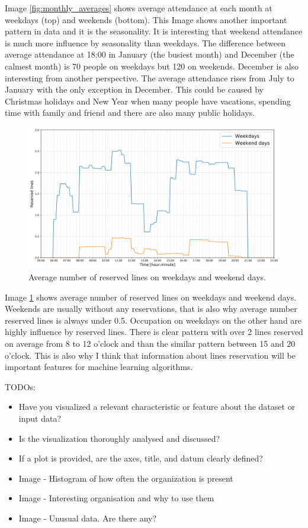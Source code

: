 \documentclass{article}
\begin{document}
Image \ref{fig:monthly_averages} shows average attendance at each month at weekdays (top) and weekends (bottom). This Image shows another important pattern in data and it is the seasonality. It is interesting that weekend attendance is much more influence by seasonality than weekdays. The difference between average attendance at 18:00 in January (the busiest month) and December (the calmest month) is 70 people on weekdays but 120 on weekends. December is also interesting from another perspective. The average attendance rises from July to January with the only exception in December. This could be caused by Christmas holidays and New Year when many people have vacations, spending time with family and friend and there are also many public holidays. 

\begin{figure}[H]
\centering
\includegraphics[width=12cm]{imgs/avg_lines.png}
\caption{Average number of reserved lines on weekdays and weekend days.}
\label{fig:lines_averages}
\end{figure}

Image \ref{fig:lines_averages} shows average number of reserved lines on weekdays and weekend days. Weekends are usually without any reservations, that is also why average number reserved lines is always under 0.5. Occupation on weekdays on the other hand are highly influence by reserved lines. There is clear pattern with over 2 lines reserved on average from 8 to 12 o'clock and than the similar pattern between 15 and 20 o'clock. This is also why I think that information about lines reservation will be important features for machine learning algorithms.

\color{red}
TODOs:
\begin{itemize}
    \item Have you visualized a relevant characteristic or feature about the dataset or input data?
    \item Is the visualization thoroughly analysed and discussed?
    \item If a plot is provided, are the axes, title, and datum clearly defined?
    \item Image - Histogram of how often the organization is present
    \item Image - Interesting organisation and why to use them 
    \item Image - Unusual data. Are there any?
\end{itemize}
\color{black}   
\end{document}
